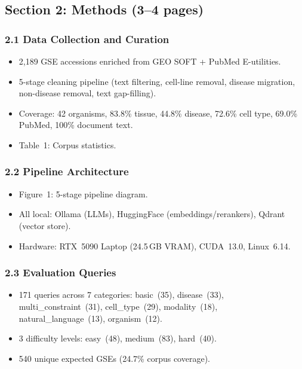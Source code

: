 \documentclass[11pt,a4paper]{article}
\begin{document}
\subsection{Section 2: Methods (3--4 pages)}

\subsubsection{2.1 Data Collection and Curation}

\begin{itemize}
  \item 2{,}189 GSE accessions enriched from GEO SOFT + PubMed E-utilities.
  \item 5-stage cleaning pipeline (text filtering, cell-line removal,
        disease migration, non-disease removal, text gap-filling).
  \item Coverage: 42 organisms, 83.8\% tissue, 44.8\% disease, 72.6\%
        cell type, 69.0\% PubMed, 100\% document text.
  \item Table~1: Corpus statistics.
\end{itemize}

\subsubsection{2.2 Pipeline Architecture}

\begin{itemize}
  \item Figure~1: 5-stage pipeline diagram.
  \item All local: Ollama (LLMs), HuggingFace (embeddings/rerankers),
        Qdrant (vector store).
  \item Hardware: RTX~5090 Laptop (24.5\,GB VRAM), CUDA~13.0, Linux~6.14.
\end{itemize}

\subsubsection{2.3 Evaluation Queries}

\begin{itemize}
  \item 171 queries across 7 categories: basic~(35), disease~(33),
        multi\_constraint~(31), cell\_type~(29), modality~(18),
        natural\_language~(13), organism~(12).
  \item 3 difficulty levels: easy~(48), medium~(83), hard~(40).
  \item 540 unique expected GSEs (24.7\% corpus coverage).
\end{itemize}
\end{document}
